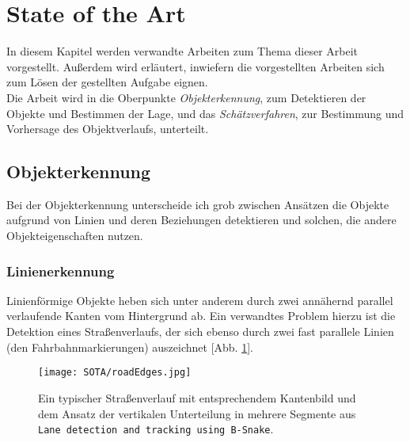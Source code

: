 \cleardoublepage
\section{State of the Art}
In diesem Kapitel werden verwandte Arbeiten zum Thema dieser Arbeit vorgestellt. Außerdem wird erläutert, inwiefern die vorgestellten Arbeiten sich zum Lösen der gestellten Aufgabe eignen.\\
Die Arbeit wird in die Oberpunkte \textit{Objekterkennung}, zum Detektieren der Objekte und Bestimmen der Lage, und das \textit{Schätzverfahren}, zur Bestimmung und Vorhersage des Objektverlaufs, unterteilt.
\subsection{Objekterkennung}
Bei der Objekterkennung unterscheide ich grob zwischen Ansätzen die Objekte aufgrund von Linien und deren Beziehungen detektieren und solchen, die andere Objekteigenschaften nutzen.
\subsubsection{Linienerkennung}
Linienförmige Objekte heben sich unter anderem durch zwei annähernd parallel verlaufende Kanten vom Hintergrund ab.
Ein verwandtes Problem hierzu ist die Detektion eines Straßenverlaufs, der sich ebenso durch zwei fast parallele Linien (den Fahrbahnmarkierungen) auszeichnet [Abb. \ref{Abb. 4}].\\
\begin{figure}[H]
	\texttt{[image: SOTA/roadEdges.jpg]}
	\caption[Typischer Straßenverlauf mit entpsrechendem Kantenbild]{Ein typischer Straßenverlauf mit entsprechendem Kantenbild und dem Ansatz der vertikalen Unterteilung in mehrere Segmente aus \texttt{Lane detection and tracking using B-Snake}\cite{wang2004lane}.}
	\label{Abb. 4}
\end{figure}

